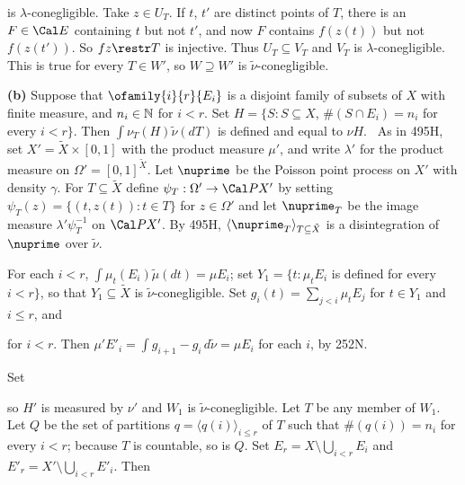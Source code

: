 {\noindent is $\lambda$-conegligible.   Take $z\in U_T$.   If $t$, $t'$
are distinct points of $T$, there is an $F\in\Cal E$ containing $t$ but
not $t'$, and now $F$ contains $f(z(t))$ but not $f(z(t'))$.   So
$fz\restr T$ is injective.   Thus $U_T\subseteq V_T$ and $V_T$ is
$\lambda$-conegligible.   This is true for every $T\in W'$, so
$W\supseteq W'$ is $\tilde\nu$-conegligible.\ \Qed

\medskip

{\bf (b)} Suppose that $\ofamily{i}{r}{E_i}$ is a disjoint family of
subsets of $X$ with finite measure, and $n_i\in\Bbb N$ for $i<r$.   Set
$H=\{S:S\subseteq X$, $\#(S\cap E_i)=n_i$ for every $i<r\}$.   Then
$\int\nu_T(H)\tilde\nu(dT)$ is defined and equal to $\nu H$.   \Prf\
As in 495H, set $X'=\tilde X\times[0,1]$ with the product measure
$\mu'$, and write $\lambda'$ for the product measure on
$\Omega'=[0,1]^{\tilde X}$.   Let $\nuprime$ be the Poisson point
process on
$X'$ with density $\gamma$.   For $T\subseteq\tilde X$ define
$\psi_T:\Omega'\to\Cal PX'$ by setting $\psi_T(z)=\{(t,z(t)):t\in T\}$
for $z\in\Omega'$ and let $\nuprime_T$ be the image measure
$\lambda'\psi_T^{-1}$ on $\Cal PX'$.   By 495H,
$\langle\nuprime_T\rangle_{T\subseteq\tilde X}$ is a disintegration of
$\nuprime$ over $\tilde\nu$.

For each $i<r$, $\int\mu_t(E_i)\tilde\mu(dt)=\mu E_i$;  set
$Y_1=\{t:\mu_tE_i$ is defined for every $i<r\}$, so that
$Y_1\subseteq\tilde X$ is $\tilde\nu$-conegligible.   Set
$g_i(t)=\sum_{j<i}\mu_tE_j$ for $t\in Y_1$ and $i\le r$, and


\noindent for $i<r$.   Then
$\mu'E'_i=\int g_{i+1}-g_i\,d\tilde\nu=\mu E_i$ for each $i$, by 252N.

Set



\noindent so $H'$ is measured by $\nu'$ and
$W_1$ is $\tilde\nu$-conegligible.   Let $T$ be any
member of $W_1$.   Let $Q$ be the set of partitions
$q=\langle q(i)\rangle_{i\le r}$ of $T$ such that $\#(q(i))=n_i$ for
every $i<r$;  because $T$ is countable, so is $Q$.   Set
$E_r=X\setminus\bigcup_{i<r}E_i$ and
$E'_r=X'\setminus\bigcup_{i<r}E'_i$.   Then


}
